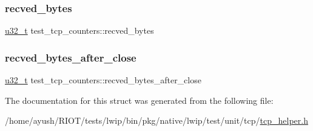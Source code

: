 \mbox{\label{structtest__tcp__counters_a1ac42e63bd4e3ad41bff07d61bfb1741}} 
\subsubsection{\texorpdfstring{recved\+\_\+bytes}{recved\_bytes}}
{\footnotesize\ttfamily \hyperlink{group__compiler__abstraction_ga4c14294869aceba3ef9d4c0c302d0f33}{u32\+\_\+t} test\+\_\+tcp\+\_\+counters\+::recved\+\_\+bytes}

\mbox{\label{structtest__tcp__counters_add2b14593471262f5efab948cb3006c6}} 
\subsubsection{\texorpdfstring{recved\+\_\+bytes\+\_\+after\+\_\+close}{recved\_bytes\_after\_close}}
{\footnotesize\ttfamily \hyperlink{group__compiler__abstraction_ga4c14294869aceba3ef9d4c0c302d0f33}{u32\+\_\+t} test\+\_\+tcp\+\_\+counters\+::recved\+\_\+bytes\+\_\+after\+\_\+close}



The documentation for this struct was generated from the following file\+:\begin{DoxyCompactItemize}
\item 
/home/ayush/\+R\+I\+O\+T/tests/lwip/bin/pkg/native/lwip/test/unit/tcp/\hyperlink{native_2lwip_2test_2unit_2tcp_2tcp__helper_8h}{tcp\+\_\+helper.\+h}\end{DoxyCompactItemize}
